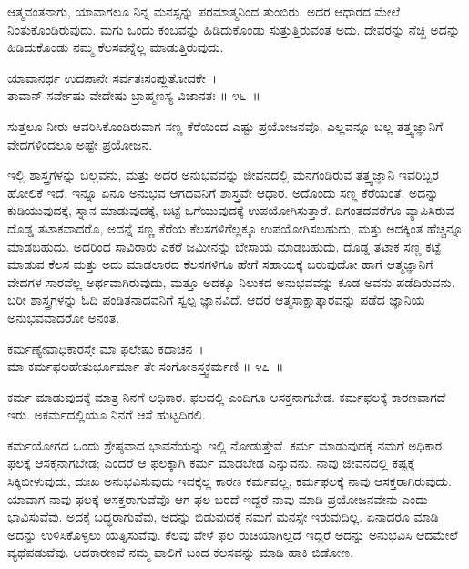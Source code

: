 ಆತ್ಮವಂತನಾಗು, ಯಾವಾಗಲೂ ನಿನ್ನ ಮನಸ್ಸನ್ನು ಪರಮಾತ್ಮನಿಂದ ತುಂಬಿರು. ಅದರ ಆಧಾರದ ಮೇಲೆ ನಿಂತುಕೊಂಡಿರುವುದು. ಮಗು ಒಂದು ಕಂಬವನ್ನು ಹಿಡಿದುಕೊಂಡು ಸುತ್ತುತ್ತಿರುವಂತೆ ಅದು. ದೇವರನ್ನು ನೆಚ್ಚಿ ಅದನ್ನು ಹಿಡಿದುಕೊಂಡು ನಮ್ಮ ಕೆಲಸವನ್ನೆಲ್ಲ ಮಾಡುತ್ತಿರುವುದು.

\begin{shloka}
ಯಾವಾನರ್ಥ ಉದಪಾನೇ ಸರ್ವತಃಸಂಪ್ಲುತೋದಕೇ~।\\ತಾವಾನ್ ಸರ್ವೇಷು ವೇದೇಷು ಬ್ರಾಹ್ಮಣಸ್ಯ ವಿಜಾನತಃ \hfill॥ ೪೬~॥
\end{shloka}

\begin{artha}
ಸುತ್ತಲೂ ನೀರು ಆವರಿಸಿಕೊಂಡಿರುವಾಗ ಸಣ್ಣ ಕೆರೆಯಿಂದ ಎಷ್ಟು ಪ್ರಯೋಜನವೊ, ಎಲ್ಲವನ್ನೂ ಬಲ್ಲ ತತ್ತ್ವಜ್ಞಾನಿಗೆ ವೇದಗಳಿಂದಲೂ ಅಷ್ಟೇ ಪ್ರಯೋಜನ.
\end{artha}

ಇಲ್ಲಿ ಶಾಸ್ತ್ರಗಳನ್ನು ಬಲ್ಲವನು, ಮತ್ತು ಅದರ ಅನುಭವವನ್ನು ಜೀವನದಲ್ಲಿ ಮನಗಂಡಿರುವ ತತ್ತ್ವಜ್ಞಾನಿ ಇವರಿಬ್ಬರ ಹೋಲಿಕೆ ಇದೆ. ಇನ್ನೂ ಏನೂ ಅನುಭವ ಆಗದವನಿಗೆ ಶಾಸ್ತ್ರವೇ ಆಧಾರ. ಅದೊಂದು ಸಣ್ಣ ಕೆರೆಯಂತೆ. ಅದನ್ನು ಕುಡಿಯುವುದಕ್ಕೆ, ಸ್ನಾನ ಮಾಡುವುದಕ್ಕೆ, ಬಟ್ಟೆ ಒಗೆಯುವುದಕ್ಕೆ ಉಪಯೋಗಿಸುತ್ತಾರೆ. ದಿಗಂತದವರೆಗೂ ವ್ಯಾಪಿಸಿರುವ ದೊಡ್ಡ ತಟಾಕವಾದರೊ, ಅದನ್ನೆ ಸಣ್ಣ ಕೆರೆಯ ಕೆಲಸಗಳಿಗೆಲ್ಲಕ್ಕೂ ಉಪಯೋಗಿಸಬಹುದು, ಮತ್ತು ಅದಕ್ಕಿಂತ ಹೆಚ್ಚನ್ನೂ ಮಾಡಬಹುದು. ಅದರಿಂದ ಸಾವಿರಾರು ಎಕರೆ ಜಮೀನನ್ನು ಬೇಸಾಯ ಮಾಡಬಹುದು. ದೊಡ್ಡ ತಟಾಕ ಸಣ್ಣ ಕಟ್ಟೆ ಮಾಡುವ ಕೆಲಸ ಮತ್ತು ಅದು ಮಾಡಲಾರದ ಕೆಲಸಗಳಿಗೂ ಹೇಗೆ ಸಹಾಯಕ್ಕೆ ಬರುವುದೋ ಹಾಗೆ ಆತ್ಮಜ್ಞಾನಿಗೆ ವೇದಗಳ ಸಾರವೆಲ್ಲ ಅರ್ಥವಾಗಿರುವುದು, ಮತ್ತೂ ಅದಕ್ಕೂ ನಿಲುಕದ ಅನುಭವವನ್ನು ಕೂಡ ಅವನು ಪಡೆದಿರುವನು. ಬರೀ ಶಾಸ್ತ್ರಗಳನ್ನು ಓದಿ ಪಂಡಿತನಾದವನಿಗೆ ಸ್ವಲ್ಪ ಜ್ಞಾನವಿದೆ. ಆದರೆ ಆತ್ಮಸಾಕ್ಷಾತ್ಕಾರವನ್ನು ಪಡೆದ ಜ್ಞಾನಿಯ ಅನುಭವವಾದರೋ ಅನಂತ.

\begin{shloka}
ಕರ್ಮಣ್ಯೇವಾಧಿಕಾರಸ್ತೇ ಮಾ ಫಲೇಷು ಕದಾಚನ~।\\ಮಾ ಕರ್ಮಫಲಹೇತುರ್ಭೂರ್ಮಾ ತೇ ಸಂಗೋಽಸ್ತ್ವಕರ್ಮಣಿ \hfill॥ ೪೭~॥
\end{shloka}

\begin{artha}
ಕರ್ಮ ಮಾಡುವುದಕ್ಕೆ ಮಾತ್ರ ನಿನಗೆ ಅಧಿಕಾರ. ಫಲದಲ್ಲಿ ಎಂದಿಗೂ ಆಸಕ್ತನಾಗಬೇಡ. ಕರ್ಮಫಲಕ್ಕೆ ಕಾರಣವಾಗದೆ ಇರು. ಅಕರ್ಮದಲ್ಲಿಯೂ ನಿನಗೆ ಆಸೆ ಹುಟ್ಟದಿರಲಿ.
\end{artha}

ಕರ್ಮಯೋಗದ ಒಂದು ಶ್ರೇಷ್ಠವಾದ ಭಾವನೆಯನ್ನು ಇಲ್ಲಿ ನೋಡುತ್ತೇವೆ. ಕರ್ಮ ಮಾಡುವುದಕ್ಕೆ ನಮಗೆ ಅಧಿಕಾರ. ಫಲಕ್ಕೆ ಆಸಕ್ತನಾಗಬೇಡ; ಎಂದರೆ ಆ ಫಲಕ್ಕಾಗಿ ಕರ್ಮ ಮಾಡಬೇಡ ಎನ್ನುವನು. ನಾವು ಜೀವನದಲ್ಲಿ ಕಷ್ಟಕ್ಕೆ ಸಿಕ್ಕಿಬೀಳುವುದು, ದುಃಖ ಅನುಭವಿಸುವುದು ಇವಕ್ಕೆಲ್ಲ ಕಾರಣ ಕರ್ಮವಲ್ಲ, ಕರ್ಮಫಲಕ್ಕೆ ನಾವು ಆಸಕ್ತರಾಗಿರುವುದು. ಯಾವಾಗ ನಾವು ಫಲಕ್ಕೆ ಆಸಕ್ತರಾಗುವೆವೊ ಆಗ ಫಲ ಬರದೆ ಇದ್ದರೆ ನಾವು ಮಾಡಿ ಪ್ರಯೋಜನವೇನು ಎಂದು ಭಾವಿಸುವೆವು. ಅದಕ್ಕೆ ಬದ್ಧರಾಗುವೆವು, ಅದನ್ನು ಬಿಡುವುದಕ್ಕೆ ನಮಗೆ ಮನಸ್ಸೇ ಇರುವುದಿಲ್ಲ. ಏನಾದರೂ ಮಾಡಿ ಅದನ್ನು ಉಳಿಸಿಕೊಳ್ಳಲು ಯತ್ನಿಸುವೆವು. ಕೆಲವು ವೇಳೆ ಫಲ ರುಚಿಯಾಗಿಲ್ಲದೆ ಇದ್ದರೆ ಅದನ್ನು ಅನುಭವಿಸಿ ಆದಮೇಲೆ ವ್ಯಥೆಪಡುವೆವು. ಆದಕಾರಣವೆ ನಮ್ಮ ಪಾಲಿಗೆ ಬಂದ ಕೆಲಸವನ್ನು ಮಾಡಿ ಹಾಕಿ ಬಿಡೋಣ.

